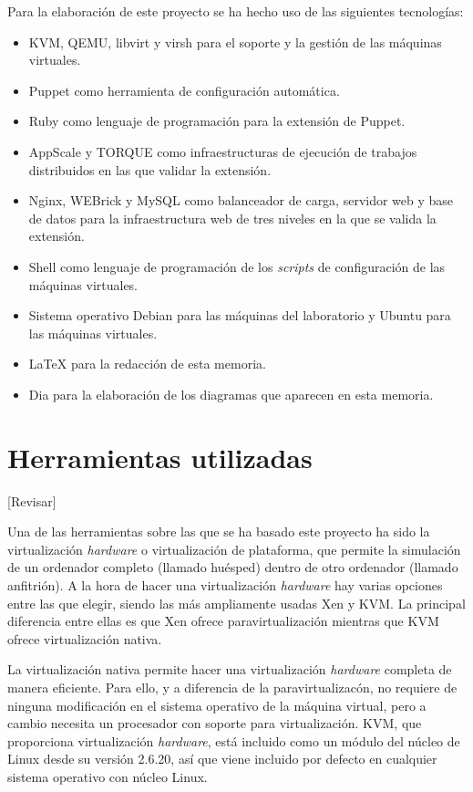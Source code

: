 Para la elaboración de este proyecto se ha hecho uso de las siguientes tecnologías:
\begin{itemize}
\item KVM, QEMU, libvirt y virsh para el soporte y la gestión de las máquinas virtuales.
\item Puppet como herramienta de configuración automática.
\item Ruby como lenguaje de programación para la extensión de Puppet.
\item AppScale y TORQUE como infraestructuras de ejecución de trabajos distribuidos en las que validar la extensión.
\item Nginx, WEBrick y MySQL como balanceador de carga, servidor web y base de datos para la infraestructura web de tres niveles en la que se valida la extensión.
\item Shell como lenguaje de programación de los \emph{scripts} de configuración de las máquinas virtuales.
\item Sistema operativo Debian para las máquinas del laboratorio y Ubuntu para las máquinas virtuales.
\item \LaTeX{} \cite{manual:latex} para la redacción de esta memoria.
\item Dia para la elaboración de los diagramas que aparecen en esta memoria.
\end{itemize}


\section{Herramientas utilizadas}

[Revisar]

Una de las herramientas sobre las que se ha basado este proyecto ha sido la virtualización \emph{hardware} o virtualización de plataforma, que permite la simulación de un ordenador completo (llamado huésped) dentro de otro ordenador (llamado anfitrión). A la hora de hacer una virtualización \emph{hardware} hay varias opciones entre las que elegir, siendo las más ampliamente usadas Xen y KVM. La principal diferencia entre ellas es que Xen ofrece paravirtualización mientras que KVM ofrece virtualización nativa.

La virtualización nativa permite hacer una virtualización \emph{hardware} completa de manera eficiente. Para ello, y a diferencia de la paravirtualizacón, no requiere de ninguna modificación en el sistema operativo de la máquina virtual, pero a cambio necesita un procesador con soporte para virtualización. KVM, que proporciona virtualización \emph{hardware}, está incluido como un módulo del núcleo de Linux desde su versión 2.6.20, así que viene incluido por defecto en cualquier sistema operativo con núcleo Linux.

